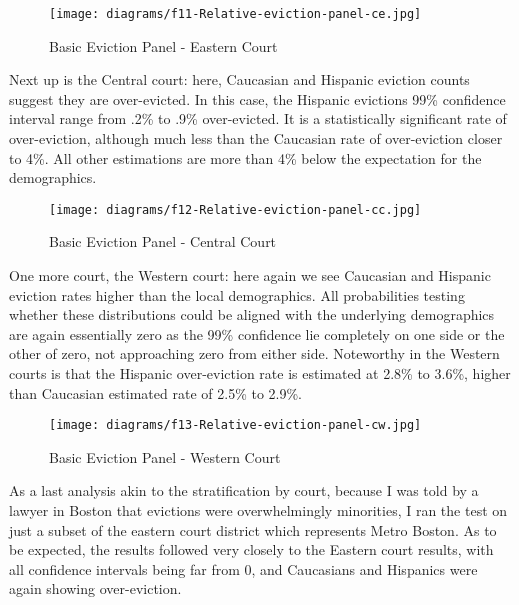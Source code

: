 \begin{figure}
  \begin{center}
    \texttt{[image: diagrams/f11-Relative-eviction-panel-ce.jpg]}
  \end{center}
  \caption{Basic Eviction Panel - Eastern Court}
\label{fig:figure11}
\end{figure}

\par Next up is the Central court: here, Caucasian and Hispanic eviction counts suggest they are over-evicted.  In this case, the Hispanic evictions 99\% confidence interval range from .2\% to .9\% over-evicted.  It is a statistically significant rate of over-eviction, although much less than the Caucasian rate of over-eviction closer to 4\%.  All other estimations are more than 4\% below the expectation for the demographics.

\begin{figure}
  \begin{center}
    \texttt{[image: diagrams/f12-Relative-eviction-panel-cc.jpg]}
  \end{center}
  \caption{Basic Eviction Panel - Central Court}
\label{fig:figure12}
\end{figure}

\par One more court, the Western court: here again we see Caucasian and Hispanic eviction rates higher than the local demographics.  All probabilities testing whether these distributions could be aligned with the underlying demographics are again essentially zero as the 99\% confidence lie completely on one side or the other of zero, not approaching zero from either side.  Noteworthy in the Western courts is that the Hispanic over-eviction rate is estimated at 2.8\% to 3.6\%, higher than Caucasian estimated rate of 2.5\% to 2.9\%.

\begin{figure}
  \begin{center}
    \texttt{[image: diagrams/f13-Relative-eviction-panel-cw.jpg]}
  \end{center}
  \caption{Basic Eviction Panel - Western Court}
\label{fig:figure13}
\end{figure}

\par As a last analysis akin to the stratification by court, because I was told by a lawyer in Boston that evictions were overwhelmingly minorities, I ran the test on just a subset of the eastern court district which represents Metro Boston.  As to be expected, the results followed very closely to the Eastern court results, with all confidence intervals being far from 0, and Caucasians and Hispanics were again showing over-eviction.

